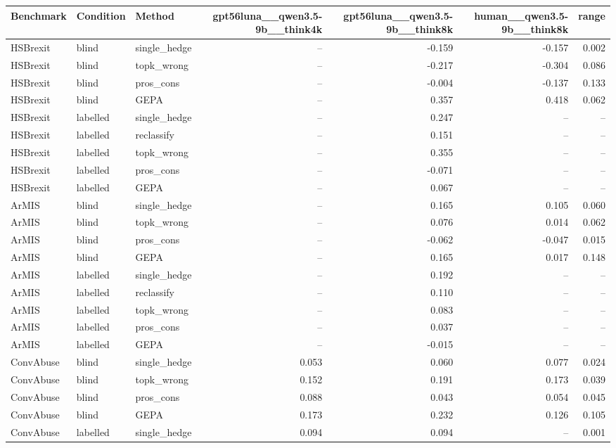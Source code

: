 \begin{table}[t]
\centering
\small
\begin{tabular}{lllrrrr}
\hline
Benchmark & Condition & Method & gpt56luna\_\_qwen3.5-9b\_\_think4k & gpt56luna\_\_qwen3.5-9b\_\_think8k & human\_\_qwen3.5-9b\_\_think8k & range \\
\hline
HSBrexit & blind & single\_hedge & -- & -0.159 & -0.157 & 0.002 \\
HSBrexit & blind & topk\_wrong & -- & -0.217 & -0.304 & 0.086 \\
HSBrexit & blind & pros\_cons & -- & -0.004 & -0.137 & 0.133 \\
HSBrexit & blind & GEPA & -- & 0.357 & 0.418 & 0.062 \\
HSBrexit & labelled & single\_hedge & -- & 0.247 & -- & -- \\
HSBrexit & labelled & reclassify & -- & 0.151 & -- & -- \\
HSBrexit & labelled & topk\_wrong & -- & 0.355 & -- & -- \\
HSBrexit & labelled & pros\_cons & -- & -0.071 & -- & -- \\
HSBrexit & labelled & GEPA & -- & 0.067 & -- & -- \\
ArMIS & blind & single\_hedge & -- & 0.165 & 0.105 & 0.060 \\
ArMIS & blind & topk\_wrong & -- & 0.076 & 0.014 & 0.062 \\
ArMIS & blind & pros\_cons & -- & -0.062 & -0.047 & 0.015 \\
ArMIS & blind & GEPA & -- & 0.165 & 0.017 & 0.148 \\
ArMIS & labelled & single\_hedge & -- & 0.192 & -- & -- \\
ArMIS & labelled & reclassify & -- & 0.110 & -- & -- \\
ArMIS & labelled & topk\_wrong & -- & 0.083 & -- & -- \\
ArMIS & labelled & pros\_cons & -- & 0.037 & -- & -- \\
ArMIS & labelled & GEPA & -- & -0.015 & -- & -- \\
ConvAbuse & blind & single\_hedge & 0.053 & 0.060 & 0.077 & 0.024 \\
ConvAbuse & blind & topk\_wrong & 0.152 & 0.191 & 0.173 & 0.039 \\
ConvAbuse & blind & pros\_cons & 0.088 & 0.043 & 0.054 & 0.045 \\
ConvAbuse & blind & GEPA & 0.173 & 0.232 & 0.126 & 0.105 \\
ConvAbuse & labelled & single\_hedge & 0.094 & 0.094 & -- & 0.001 \\

\end{tabular}
\end{table}
